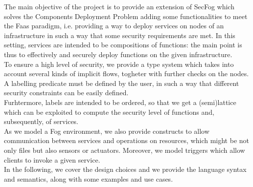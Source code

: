 \documentclass[../DraftNotes.tex]{subfiles}
\begin{document}
The main objective of the project is to provide an extension of SecFog which solves the Components Deployment Problem adding some functionalities to meet the Faas paradigm, i.e. providing a way to deploy services on nodes of an infrastructure in such a way that some security requirements are met. In this setting, services are intended to be compositions of functions: the main point is thus to effectively and securely deploy functions on the given infrastructure. \\
To ensure a high level of security, we provide a type system which takes into account several kinds of implicit flows, togheter with further checks on the nodes. A labelling predicate must be defined by the user, in such a way that different security constraints can be easily defined. \\
Furhtermore, labels are intended to be ordered, so that we get a (semi)lattice which can be exploited to compute the security level of functions and, subsequently, of services. \\
As we model a Fog environment, we also provide constructs to allow communication between services and operations on resources, which might be not only files but also sensors or actuators. Moreover, we model triggers which allow clients to invoke a given service. \\
In the following, we cover the design choices and we provide the language syntax and semantics, along with some examples and use cases.
\end{document}
